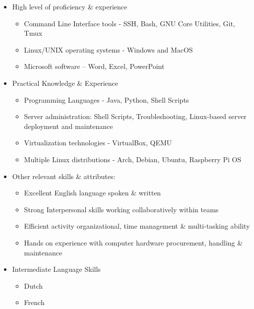 \begin{cvparagraph}



\begin{multicols}{2}


	\vspace{-\topsep}
	\begin{itemize}
		\setlength{\parskip}{0pt}
		\setlength{\itemsep}{0pt plus 1pt}

		\item{High level of proficiency \& experience}
			\begin{itemize}
					\item{Command Line Interface tools - SSH, Bash, GNU Core Utilities, Git, Tmux}
					\item{Linux/UNIX operating systems - Windows and MacOS}
					\item{Microsoft software – Word, Excel, PowerPoint}
			\end{itemize}
		\item{Practical Knowledge \& Experience}
			\begin{itemize}
				\item{Programming Languages - Java, Python, Shell Scripts}
				\item{Server administration: Shell Scripts, Troubleshooting, Linux-based server deployment and maintenance}
				\item{Virtualization technologies - VirtualBox, QEMU}
				\item{Multiple Linux distributions - Arch, Debian, Ubuntu, Raspberry Pi OS}
			\end{itemize}
		\item{Other relevant skills \& attributes:}
			\begin{itemize}
				\item{Excellent English language spoken \& written}
				\item{Strong Interpersonal skills working collaboratively within teams}
				\item{Efficient activity organizational, time management \& multi-tasking ability}
				\item{Hands on experience with computer hardware procurement, handling \& maintenance}
			\end{itemize}
		\item{Intermediate Language Skills}
			\begin{itemize}
				\item{Dutch}
				\item{French}
			\end{itemize}


\end{itemize}
\end{multicols}
\end{cvparagraph}
